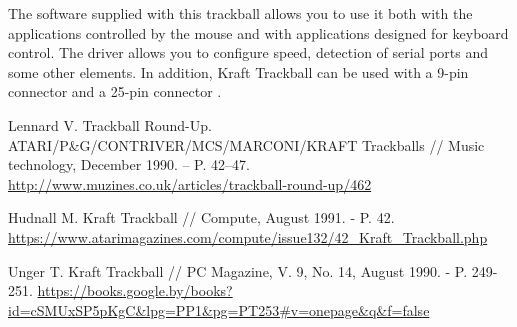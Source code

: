 \documentclass[11pt, a4paper]{article}
\begin{document}
The software supplied with this trackball allows you to use it both with the applications controlled by the mouse and with applications designed for keyboard control. The driver allows you to configure speed, detection of serial ports and some other elements. In addition, Kraft Trackball can be used with a 9-pin connector and a 25-pin connector \cite{Hudnall}.

\begin{thebibliography}{9}
 Lennard V. Trackball Round-Up. ATARI/P\&G/CONTRIVER/MCS/MARCONI/KRAFT Trackballs // Music technology, December 1990. -- P. 42--47. \url{http://www.muzines.co.uk/articles/trackball-round-up/462}

 Hudnall M. Kraft Trackball // Compute, August 1991. - P. 42. \url{https://www.atarimagazines.com/compute/issue132/42_Kraft_Trackball.php}

 Unger T. Kraft Trackball // PC Magazine, V. 9, No. 14, August 1990. - P. 249-251. \url{https://books.google.by/books?id=cSMUxSP5pKgC&lpg=PP1&pg=PT253#v=onepage&q&f=false}
\end{thebibliography}
\end{document}
